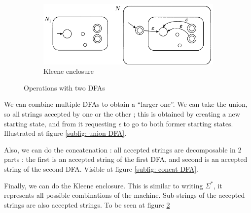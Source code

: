 \documentclass[12pt,a4paper]{article}
\newcommand{\<}{\langle}
\renewcommand{\>}{\rangle}
\begin{document}
\begin{figure}
    \begin{subfigure}{0.45\textwidth}
        \includegraphics[scale=0.5]{images/kleene_dfa}
        \caption{Kleene enclosure}
        \label{subfig: kleene dfa}
\end{subfigure}
    \caption{Operations with two DFAs}
\end{figure}
We can combine multiple DFAs to obtain a ``larger one''. We can take the union, so all strings accepted by one or the other ; this is obtained by creating a new starting state, and from it requesting $\epsilon$ to go to both former starting states. Illustrated at figure \ref{subfig: union DFA}.

Also, we can do  the concatenation : all accepted strings are decomposable in 2 parts : the first is an accepted string of the first DFA, and second is an accepted string of the second DFA. Visible at figure \ref{subfig: concat DFA}.

Finally, we can do the Kleene enclosure. This is similar to writing $\Sigma^*$, it represents all possible combinations of the machine. Sub-strings of the accepted strings are also accepted strings. To be seen at figure \ref{subfig: kleene dfa}
\end{document}
